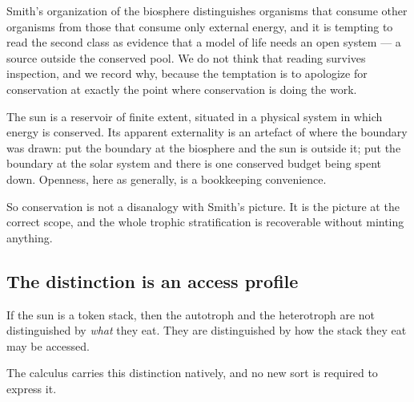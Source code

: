 Smith's organization of the biosphere \cite{SmithMorowitz} distinguishes organisms that consume other
organisms from those that consume only external energy, and it is tempting to read the second class as
evidence that a model of life needs an open system --- a source outside the conserved pool. We do not
think that reading survives inspection, and we record why, because the temptation is to apologize for
conservation at exactly the point where conservation is doing the work.

The sun is a reservoir of finite extent, situated in a physical system in which energy is conserved.
Its apparent externality is an artefact of where the boundary was drawn: put the boundary at the
biosphere and the sun is outside it; put the boundary at the solar system and there is one conserved
budget being spent down. Openness, here as generally, is a bookkeeping convenience.

So conservation is not a disanalogy with Smith's picture. It is the picture at the correct scope, and
the whole trophic stratification is recoverable without minting anything.

\subsection{The distinction is an access profile}\label{sci:S11.2}

If the sun is a token stack, then the autotroph and the heterotroph are not distinguished by
\emph{what} they eat. They are distinguished by how the stack they eat may be accessed.

\begin{table}[h]
\centering
{}
\caption{The trophic distinction is an access profile, not a kind of substance.}
\label{sci:tab:trophic}
\end{table}

The calculus carries this distinction natively, and no new sort is required to express it.


